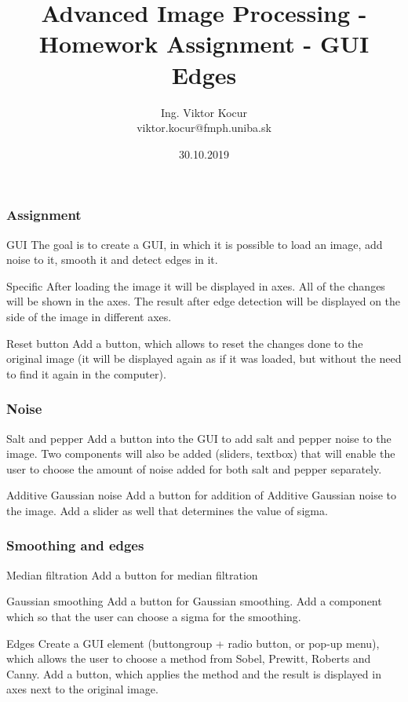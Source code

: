 \documentclass{beamer}
\title[1. Homework]{Advanced Image Processing - Homework Assignment - GUI Edges}
\author[Kocur]{Ing. Viktor Kocur \\{\small viktor.kocur@fmph.uniba.sk}}
\institute{DAI FMFI UK}
\date{30.10.2019}
\begin{document}

\begin{frame}
  \titlepage
\end{frame}

\begin{frame}
\frametitle{Assignment}
\begin{block}{GUI}
The goal is to create a GUI, in which it is possible to load an image, add noise to it, smooth it and detect edges in it.
\end{block}

\begin{block}{Specific}
After loading the image it will be displayed in axes. All of the changes will be shown in the axes. The result after edge detection will be displayed on the side of the image in different axes.
\end{block}


\begin{block}{Reset button}
Add a button, which allows to reset the changes done to the original image (it will be displayed again as if it was loaded, but without the need to find it again in the computer).
\end{block}
\end{frame}


\begin{frame}
\frametitle{Noise}
\begin{block}{Salt and pepper}
Add a button into the GUI to add salt and pepper noise to the image. Two components will also be added (sliders, textbox) that will enable the user to choose the amount of noise added for both salt and pepper separately. 
\end{block}

\begin{block}{Additive Gaussian noise}
Add a button for addition of Additive Gaussian noise to the image. Add a slider as well that determines the value of sigma.
\end{block}
\end{frame}

\begin{frame}
\frametitle{Smoothing and edges}

\begin{block}{Median filtration}
Add a button for median filtration
\end{block}

\begin{block}{Gaussian smoothing}
Add a button for Gaussian smoothing. Add a component which so that the user can choose a sigma for the smoothing.
\end{block}

\begin{block}{Edges}
Create a GUI element (buttongroup + radio button, or pop-up menu), which allows the user to choose a method from Sobel, Prewitt, Roberts and Canny. Add a button, which applies the method and the result is displayed in axes next to the original image.
\end{block}
\end{frame}
\end{document}

